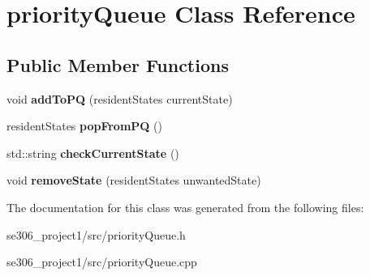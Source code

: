 \hypertarget{classpriorityQueue}{\section{priority\-Queue Class Reference}
\label{classpriorityQueue}
}
\subsection*{Public Member Functions}
\begin{DoxyCompactItemize}
\item 
\hypertarget{classpriorityQueue_a58658233e429bf3666dc4eb5300012c4}{void {\bfseries add\-To\-P\-Q} (resident\-States current\-State)}\label{classpriorityQueue_a58658233e429bf3666dc4eb5300012c4}

\item 
\hypertarget{classpriorityQueue_a78d5b85232d7303cabc49c4fac41a0ec}{resident\-States {\bfseries pop\-From\-P\-Q} ()}\label{classpriorityQueue_a78d5b85232d7303cabc49c4fac41a0ec}

\item 
\hypertarget{classpriorityQueue_a1d4923612653d4b3f810b7451d21004d}{std\-::string {\bfseries check\-Current\-State} ()}\label{classpriorityQueue_a1d4923612653d4b3f810b7451d21004d}

\item 
\hypertarget{classpriorityQueue_a448eafd83ae7742c21b8f70b078ae48b}{void {\bfseries remove\-State} (resident\-States unwanted\-State)}\label{classpriorityQueue_a448eafd83ae7742c21b8f70b078ae48b}

\end{DoxyCompactItemize}


The documentation for this class was generated from the following files\-:\begin{DoxyCompactItemize}
\item 
se306\-\_\-project1/src/priority\-Queue.\-h\item 
se306\-\_\-project1/src/priority\-Queue.\-cpp\end{DoxyCompactItemize}

